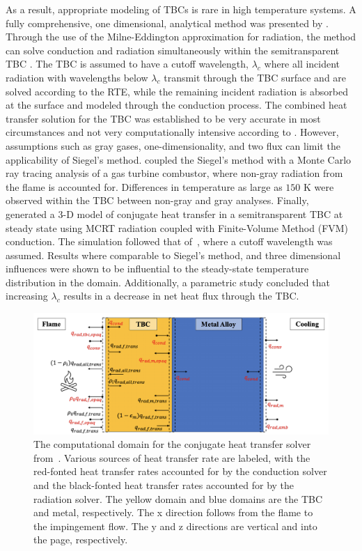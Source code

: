 As a result, appropriate modeling of TBCs is rare in high temperature systems. A fully comprehensive, one dimensional, analytical method was presented by \citet{Siegel1996InternalCoatings}. Through the use of the Milne-Eddington approximation for radiation, the method can solve conduction and radiation simultaneously
within the semitransparent TBC \cite{Milne1930ThermodynamicsStars,Eddington1920TheStars}. The TBC is assumed to have a cutoff wavelength, $\lambda{}_c$ where all incident radiation with wavelengths below $\lambda{}_c$ transmit through the TBC surface and are solved according to the RTE, while the remaining incident radiation is absorbed at the surface and modeled through the conduction process.
The combined heat transfer solution for the TBC was established to be very accurate in most circumstances and not very computationally intensive according to \citet{Siegel1996InternalCoatings}. 
However, assumptions such as gray gases, one-dimensionality, and two flux can limit the applicability of Siegel’s method. \citet{Johnson2021AnalysisMethod} coupled the Siegel’s method with a Monte Carlo ray tracing analysis of a gas turbine combustor, where non-gray radiation from the flame is accounted for. Differences in temperature as large as $150$ K were observed within the TBC between non-gray and gray analyses.
Finally,~\citet{Tricard2021ModelingEnvironments.} generated a 3-D model of conjugate heat transfer in a semitransparent TBC at steady state using MCRT radiation coupled with Finite-Volume Method (FVM) conduction. 
The simulation followed that of~\citet{Siegel1996InternalCoatings}, where a cutoff wavelength was assumed.
Results where comparable to Siegel's method, and three dimensional influences were shown to be influential to the steady-state temperature distribution in the domain. Additionally, a parametric study concluded that increasing $\lambda{}_c$ results in a decrease in net heat flux through the TBC.
\begin{figure}
\centering
\includegraphics[width=1\linewidth]{figures/ch2/TBC.png}
\caption{The computational domain for the conjugate heat transfer solver from~\cite{Tricard2021ModelingEnvironments.}. Various sources of heat transfer rate are labeled, with the red-fonted heat transfer rates accounted for by the conduction solver and the black-fonted heat transfer rates accounted for by the radiation solver. The yellow domain and blue domains are the TBC and metal, respectively. The x direction follows from the flame to the impingement flow. The y and z directions are vertical and into the page, respectively. }
\label{fig:TBC}
\end{figure}

